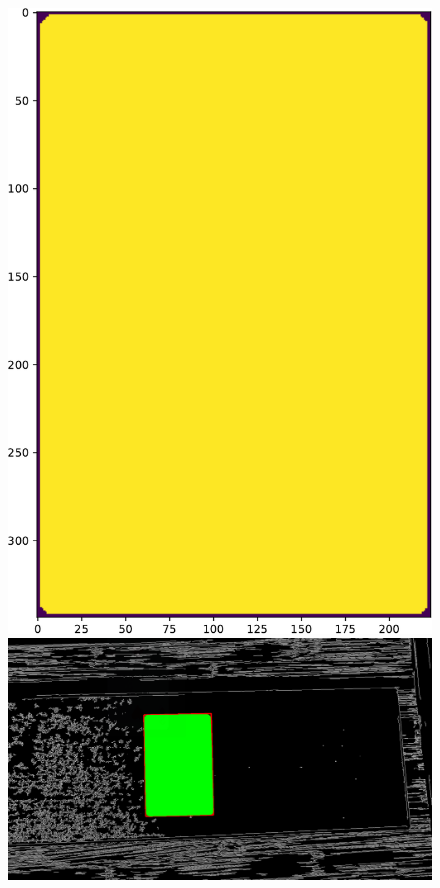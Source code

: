 \begin{frame}
\begin{itemize}
\end{itemize}
\begin{figure}[H]
  \centering
      \includegraphics[scale=0.15]{slike/alphamask.pdf} \hspace{1.2cm}
      \includegraphics[scale=0.12]{slike/extract_2hCrop.png}
 \end{figure}
\end{frame}
